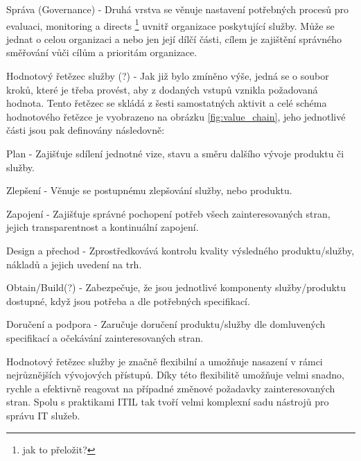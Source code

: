 \documentclass[
  digital,     %
  twoside,     %
  lof,         %
  lot,         %
]{fithesis4}
\begin{document}
\begin{compactitem}
\begin{compactitem}
    \end{compactitem} 
    \item Správa (Governance) - Druhá vrstva se věnuje nastavení potřebných procesů pro evaluaci, monitoring a directs \footnote{jak to přeložit?} uvnitř organizace poskytující služby. Může se jednat o celou organizaci a nebo jen její dílčí části, cílem je zajištění správného směřování vůči cílům a prioritám organizace. 
    \item Hodnotový řetězec služby (?) - Jak již bylo zmíněno výše, jedná se o soubor kroků, které je třeba provést, aby z dodaných vstupů vznikla požadovaná hodnota. Tento řetězec se skládá z šesti samostatných aktivit a celé schéma hodnotového řetězce je vyobrazeno na obrázku \ref{fig:value_chain}, jeho jednotlivé části jsou pak definovány následovně:
    \begin{compactitem}
        \item Plan - Zajišťuje sdílení jednotné vize, stavu a směru dalšího vývoje produktu či služby.
        \item Zlepšení - Věnuje se postupnému zlepšování služby, nebo produktu.
        \item Zapojení - Zajišťuje správné pochopení potřeb všech zainteresovaných stran, jejich transparentnost a kontinuální zapojení. 
        \item Design a přechod - Zprostředkovává kontrolu kvality výsledného produktu/služby, nákladů a jejich uvedení na trh.
        \item Obtain/Build(?) - Zabezpečuje, že jsou jednotlivé komponenty služby/produktu dostupné, když jsou potřeba a dle potřebných specifikací.
        \item Doručení a podpora - Zaručuje doručení produktu/služby dle domluvených specifikací a očekávání zainteresovaných stran.
    \end{compactitem}
    Hodnotový řetězec služby je značně flexibilní a umožňuje nasazení v rámci nejrůznějších vývojových přístupů. Díky této flexibilitě umožňuje velmi snadno, rychle a efektivně reagovat na případné změnové požadavky zainteresovaných stran. Spolu s praktikami ITIL tak tvoří velmi komplexní sadu nástrojů pro správu IT služeb.\parencite[s.~21]{Cartlidge2020}


\end{compactitem}
\end{document}
